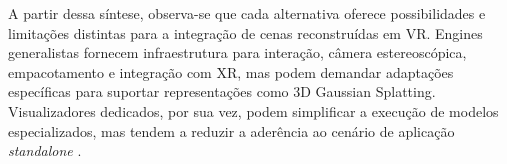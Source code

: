 A partir dessa síntese, observa-se que cada alternativa oferece possibilidades e limitações distintas para a integração de cenas reconstruídas em VR. Engines generalistas fornecem infraestrutura para interação, câmera estereoscópica, empacotamento e integração com XR, mas podem demandar adaptações específicas para suportar representações como 3D Gaussian Splatting. Visualizadores dedicados, por sua vez, podem simplificar a execução de modelos especializados, mas tendem a reduzir a aderência ao cenário de aplicação \textit{standalone} \cite{xu2023,kerbl2023,tu2025,metaquest3s2024}.
